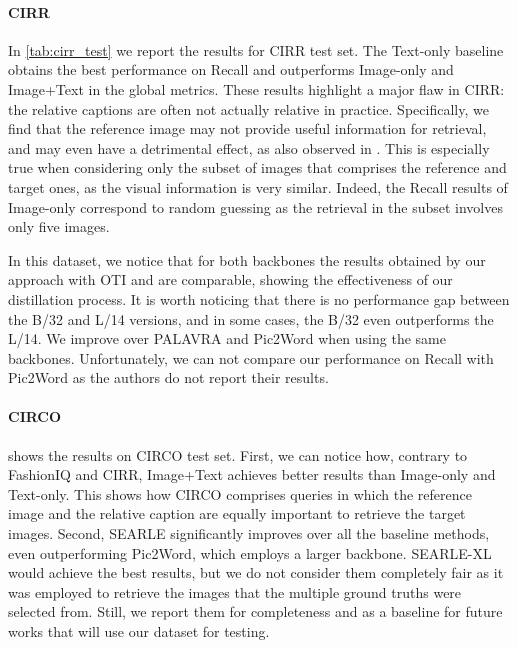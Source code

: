 \documentclass[10pt,twocolumn,letterpaper]{article}
\newcommand{\method}{SEARLE\xspace}
\begin{document}
\paragraph{CIRR} \label{sec:cirr_results}
In \cref{tab:cirr_test} we report the results for CIRR test set. The Text-only baseline obtains the best performance on Recall and outperforms Image-only and Image+Text in the global metrics. These results highlight a major flaw in CIRR: the relative captions are often not actually relative in practice. Specifically, we find that the reference image may not provide useful information for retrieval, and may even have a detrimental effect, as also observed in \cite{saito2023pic2word}. This is especially true when considering only the subset of images that comprises the reference and target ones, as the visual information is very similar. Indeed, the Recall results of Image-only correspond to random guessing as the retrieval in the subset involves only five images. 

In this dataset, we notice that for both backbones the results obtained by our approach with OTI and  are comparable, showing the effectiveness of our distillation process. It is worth noticing that there is no performance gap between the B/32 and L/14 versions, and in some cases, the B/32 even outperforms the L/14. We improve over PALAVRA and Pic2Word when using the same backbones. Unfortunately, we can not compare our performance on Recall with Pic2Word as the authors do not report their results.

\paragraph{CIRCO}
 shows the results on CIRCO test set. First, we can notice how, contrary to FashionIQ and CIRR, Image+Text achieves better results than Image-only and Text-only. This shows how CIRCO comprises queries in which the reference image and the relative caption are equally important to retrieve the target images. Second, \method significantly improves over all the baseline methods, even outperforming Pic2Word, which employs a larger backbone. \method-XL would achieve the best results, but we do not consider them completely fair as it was employed to retrieve the images that the multiple ground truths were selected from. Still, we report them for completeness and as a baseline for future works that will use our dataset for testing.
\end{document}
